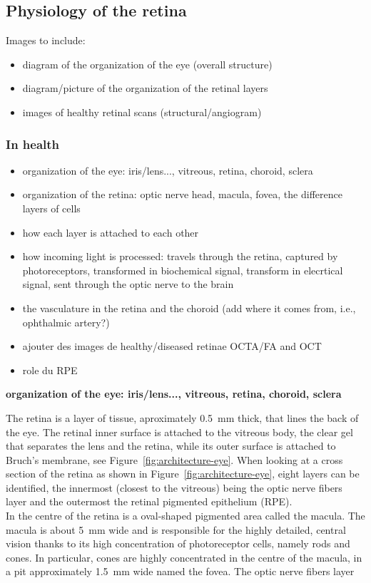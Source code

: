 \documentclass[12pt,a4paper]{journal}
\begin{document}
\subsection{Physiology of the retina}

Images to include:
\begin{itemize}
\item diagram of the organization of the eye (overall structure)
\item diagram/picture of the organization of the retinal layers
\item images of healthy retinal scans (structural/angiogram)
\end{itemize}


\subsubsection{In health}

\begin{itemize}
\item organization of the eye: iris/lens..., vitreous, retina, choroid, sclera
\item organization of the retina: optic nerve head, macula, fovea, the difference layers of cells
\item how each layer is attached to each other
\item how incoming light is processed: travels through the retina, captured by photoreceptors, transformed in biochemical signal, transform in elecrtical signal, sent through the optic nerve to the brain
\item the vasculature in the retina and the choroid (add where it comes from, i.e., ophthalmic artery?)
\item ajouter des images de healthy/diseased retinae OCTA/FA and OCT
\item role du RPE
\end{itemize}

\large\textbf{organization of the eye: iris/lens..., vitreous, retina, choroid, sclera}

The retina is a layer of tissue, aproximately \SI{0.5}{\mm} thick, that lines the back of the eye.
The retinal inner surface is attached to the vitreous body, the clear gel that separates the lens and the retina, while its outer surface is attached to Bruch's membrane, see Figure~\ref{fig:architecture-eye}.
When looking at a cross section of the retina as shown in Figure~\ref{fig:architecture-eye}, eight layers can be identified, the innermost (closest to the vitreous) being the optic nerve fibers layer and the outermost the retinal pigmented epithelium (RPE).\\
In the centre of the retina is a oval-shaped pigmented area called the macula.
The macula is about \SI{5}{\mm} wide and is responsible for the highly detailed, central vision thanks to its high concentration of photoreceptor cells, namely rods and cones.
In particular, cones are highly concentrated in the centre of the macula, in a pit approximately \SI{1.5}{\mm} wide named the fovea.
The optic nerve fibers layer 
\end{document}
